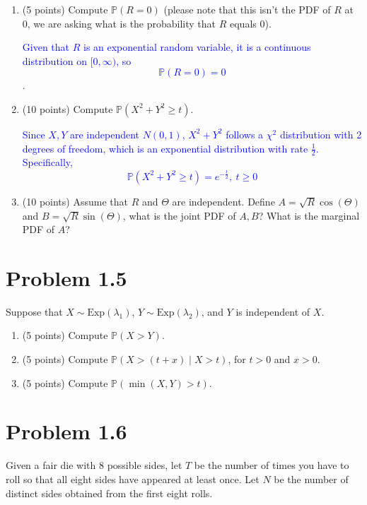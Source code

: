 \documentclass{article}
\begin{document}
\begin{enumerate}[label=(\alph*)]
    \item (5 points) Compute $\mathbb{P}(R = 0)$ (please note that this isn’t the PDF of $R$ at 0, we are asking what is the probability that $R$ equals 0).
    
        \textcolor{blue}{Given that $R$ is an exponential random variable, it is a continuous distribution on $[0,\infty)$, so $$\mathbb{P}(R=0)=0$$.}

    \item (10 points) Compute $\mathbb{P}(X^2 + Y^2 \geq t)$.

        \textcolor{blue}{Since $X,Y$ are independent $N(0,1)$, $X^2+Y^2$ follows a $\chi^2$ distribution with 2 degrees of freedom, which is an exponential distribution with rate $\frac{1}{2}$. Specifically, 
        $$\mathbb{P}(X^2+Y^2 \geq t)=e^{-\frac{t}{2}}, \ t \geq 0$$}

    \item (10 points) Assume that $R$ and $\Theta$ are independent. Define $A = \sqrt{R}\cos(\Theta)$ and $B = \sqrt{R}\sin(\Theta)$, what is the joint PDF of $A, B$? What is the marginal PDF of $A$?

    \textcolor{blue}{}

\end{enumerate}

\section*{Problem 1.5}
Suppose that $X \sim \text{Exp}(\lambda_1)$, $Y \sim \text{Exp}(\lambda_2)$, and $Y$ is independent of $X$.

\begin{enumerate}[label=(\alph*)]
    \item (5 points) Compute $\mathbb{P}(X > Y)$.
    \item (5 points) Compute $\mathbb{P}(X > (t + x) \mid X > t)$, for $t > 0$ and $x > 0$.
    \item (5 points) Compute $\mathbb{P}(\min(X, Y) > t)$.
\end{enumerate}

\section*{Problem 1.6}
Given a fair die with 8 possible sides, let $T$ be the number of times you have to roll so that all eight sides have appeared at least once. Let $N$ be the number of distinct sides obtained from the first eight rolls.
\end{document}
